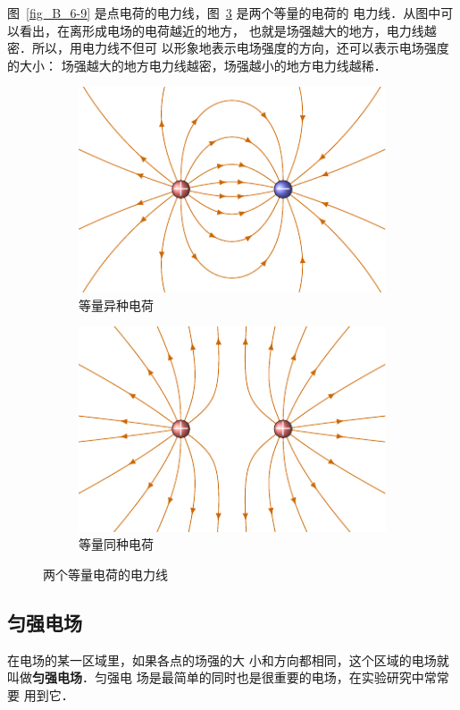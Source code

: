 图~\ref{fig_B_6-9} 是点电荷的电力线，图~\ref{fig_B_6-10} 是两个等量的电荷的
电力线．从图中可以看出，在离形成电场的电荷越近的地方，
也就是场强越大的地方，电力线越密．所以，用电力线不但可
以形象地表示电场强度的方向，还可以表示电场强度的大小：
场强越大的地方电力线越密，场强越小的地方电力线越稀．
\begin{figure}[htbp]
    \centering
    \begin{subfigure}{0.4\linewidth}
        \centering
        \includegraphics{fig/B/6-10a.pdf}
        \caption{等量异种电荷}\label{fig_B_6-10a}
    \end{subfigure}
    \hfil
    \begin{subfigure}{0.4\linewidth}
        \centering
        \includegraphics{fig/B/6-10b.pdf}
        \caption{等量同种电荷}\label{fig_B_6-10b}
    \end{subfigure}
    \caption{两个等量电荷的电力线}\label{fig_B_6-10}
\end{figure}
    


\subsection{匀强电场} 

在电场的某一区域里，如果各点的场强的大
小和方向都相同，这个区域的电场就叫做\textbf{匀强电场}．匀强电
场是最简单的同时也是很重要的电场，在实验研究中常常要
用到它．


